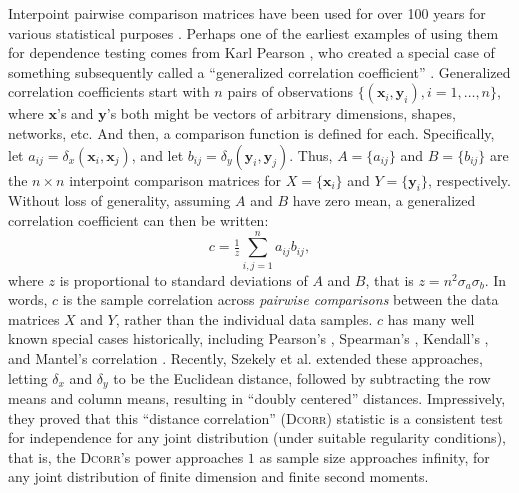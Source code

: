 \documentclass[11pt]{article}
\providecommand{\sct}[1]{{\normalfont\textsc{#1}}}
\providecommand{\mb}[1]{\boldsymbol{#1}}
\newcommand{\G}{c}
\newcommand{\Dcorr}{\sct{Dcorr}}
\newcommand{\Mantel}{\sct{Mantel}}
\newcommand{\mbx}{\ensuremath{\mb{x}}}
\newcommand{\mby}{\ensuremath{\mb{y}}}
\begin{document}
Interpoint pairwise comparison matrices have been used for over 100 years for various statistical purposes \cite{Maa1996}. Perhaps one of the earliest examples of using them for dependence testing comes from  Karl Pearson \cite{Pearson1895}, who created  a special case of something subsequently called a ``generalized correlation coefficient'' \cite{KendallBook}.
Generalized correlation coefficients start with $n$ pairs of observations $\{(\mbx_i,\mby_i),i=1,\ldots,n\}$, where $\mbx$'s and $\mby$'s both might be vectors of arbitrary dimensions, shapes, networks, etc.  And then, a comparison function is defined for each.  Specifically, let $a_{ij}=\delta_x(\mbx_i,\mbx_j)$, and let $b_{ij}=\delta_y(\mby_i,\mby_j)$.  
Thus, $A=\{a_{ij}\}$ and $B=\{b_{ij}\}$ are the $n \times n$ interpoint comparison matrices for $X=\{\mbx_{i}\}$ and $Y=\{\mby_{i}\}$, respectively.  
Without loss of generality, assuming $A$ and $B$ have zero mean, a generalized correlation coefficient can then be written:
\begin{equation}
\label{generalCoef}
\G= \tfrac{1}{z} {\textstyle \sum_{i,j=1}^n a_{ij} b_{ij}},
\end{equation}
where $z$ is proportional to standard deviations of $A$ and $B$, that is $z=n^2\sigma_a \sigma_b$.
In words, $\G$ is the sample correlation across \emph{pairwise comparisons} between the data matrices $X$ and $Y$, rather than the individual data samples.  
$\G$ has many well known special cases historically, including Pearson's  \cite{Pearson1895}, Spearman's \cite{Spearman1904},  Kendall's \cite{KendallBook}, and Mantel's correlation \cite{Mantel1967}. %
Recently, Szekely et al. \cite{SzekelyRizzoBakirov2007} extended these approaches, letting $\delta_x$ and $\delta_y$ to be the Euclidean distance, followed by subtracting the row means and column means, resulting in ``doubly centered'' distances.  Impressively, they proved that this ``distance correlation'' (\Dcorr) statistic is a consistent test for independence for any joint distribution (under suitable regularity conditions), that is, the \Dcorr's power approaches $1$ as sample size approaches infinity, for any joint distribution of finite dimension and finite second moments.
\end{document}
